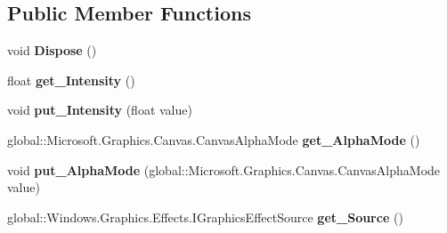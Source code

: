 \subsection*{Public Member Functions}
\begin{DoxyCompactItemize}
\item 
\mbox{\label{class_microsoft_1_1_graphics_1_1_canvas_1_1_effects_1_1_sepia_effect_a3195a9cdd413f190255cdcda3170755b}} 
void {\bfseries Dispose} ()
\item 
\mbox{\label{class_microsoft_1_1_graphics_1_1_canvas_1_1_effects_1_1_sepia_effect_aa2ff226eed0accddfe57da8d29180372}} 
float {\bfseries get\+\_\+\+Intensity} ()
\item 
\mbox{\label{class_microsoft_1_1_graphics_1_1_canvas_1_1_effects_1_1_sepia_effect_a31889c7859564211fe6944237497aa2d}} 
void {\bfseries put\+\_\+\+Intensity} (float value)
\item 
\mbox{\label{class_microsoft_1_1_graphics_1_1_canvas_1_1_effects_1_1_sepia_effect_ac68e49d7dca255583a419f008aae3de1}} 
global\+::\+Microsoft.\+Graphics.\+Canvas.\+Canvas\+Alpha\+Mode {\bfseries get\+\_\+\+Alpha\+Mode} ()
\item 
\mbox{\label{class_microsoft_1_1_graphics_1_1_canvas_1_1_effects_1_1_sepia_effect_a754dd727263b3e8cdf81de68d07ff1f9}} 
void {\bfseries put\+\_\+\+Alpha\+Mode} (global\+::\+Microsoft.\+Graphics.\+Canvas.\+Canvas\+Alpha\+Mode value)
\item 
\mbox{\label{class_microsoft_1_1_graphics_1_1_canvas_1_1_effects_1_1_sepia_effect_ae31d49568b53d15b07d27ddd36ab1436}} 
global\+::\+Windows.\+Graphics.\+Effects.\+I\+Graphics\+Effect\+Source {\bfseries get\+\_\+\+Source} ()
\item 
\mbox{\label{class_microsoft_1_1_graphics_1_1_canvas_1_1_effects_1_1_sepia_effect_a4ac2ac241338b189e8e7deaf3bccc8ba}} 

\end{DoxyCompactItemize}
